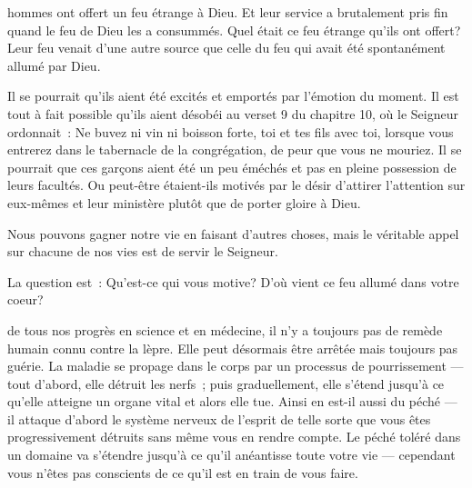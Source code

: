 
 hommes ont offert un feu étrange à Dieu.
 Et leur service a brutalement pris fin quand le feu de Dieu les a consummés.
 Quel était ce feu étrange qu'ils ont offert?
 Leur feu venait d'une autre source que celle du feu
 qui avait été spontanément allumé par Dieu.

Il se pourrait qu'ils aient été excités et emportés par l'émotion du moment.
 Il est tout à fait possible qu'ils aient désobéi au verset 9 du chapitre 10,
 où le Seigneur ordonnait~:
 \og Ne buvez ni vin ni boisson forte, toi et tes fils avec toi,
 lorsque vous entrerez dans le tabernacle de la congrégation,
 de peur que vous ne mouriez. \fg{}
 Il se pourrait que ces garçons aient été un peu éméchés
 et pas en pleine possession de leurs facultés.
 Ou peut-être étaient-ils motivés par le désir d'attirer
 l'attention sur eux-mêmes et leur ministère plutôt que de porter gloire à Dieu.


Nous pouvons gagner notre vie en faisant d'autres choses,
 mais le véritable appel sur chacune de nos vies est de servir le Seigneur.

La question est~: Qu'est-ce qui vous motive?
 D'où vient ce feu allumé dans votre coeur? 

\dvrule






 de tous nos progrès en science et en médecine,
 il n'y a toujours pas de remède humain connu contre la lèpre.
 Elle peut désormais être arrêtée mais toujours pas guérie.
 La maladie se propage dans le corps par un processus de pourrissement
 --- tout d'abord, elle détruit les nerfs~;
 puis graduellement, elle s'étend jusqu'à ce qu'elle atteigne
 un organe vital et alors elle tue.
 Ainsi en est-il aussi du péché --- il attaque d'abord le système nerveux
 de l'esprit de telle sorte que vous êtes progressivement détruits
 sans même vous en rendre compte.
 Le péché toléré dans un domaine va s'étendre jusqu'à ce qu'il anéantisse
 toute votre vie --- cependant vous n'êtes pas conscients
 de ce qu'il est en train de vous faire. 

